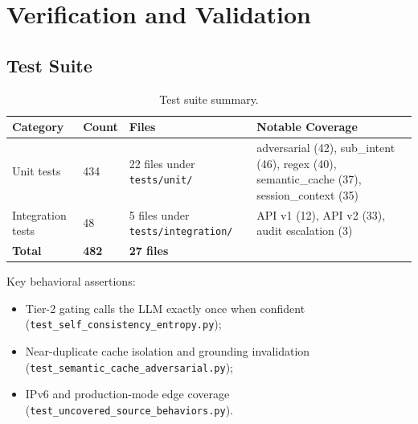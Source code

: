 ﻿\documentclass[10pt,journal,onecolumn]{IEEEtran}
\begin{document}
\section{Verification and Validation}

\subsection{Test Suite}
\begin{table}[t]
\caption{Test suite summary.}
\label{tab:testsuite}
\begin{tabularx}{\textwidth}{l l p{3cm} X}
\toprule
\textbf{Category} & \textbf{Count} & \textbf{Files} & \textbf{Notable Coverage}\\
\midrule
Unit tests & 434 & 22 files under \texttt{tests/unit/} & adversarial (42), sub\_intent (46), regex (40), semantic\_cache (37), session\_context (35)\\
Integration tests & 48 & 5 files under \texttt{tests/integration/} & API v1 (12), API v2 (33), audit escalation (3)\\
\textbf{Total} & \textbf{482} & \textbf{27 files} & \\
\bottomrule
\end{tabularx}
\end{table}

Key behavioral assertions:
\begin{itemize}
\item Tier-2 gating calls the LLM exactly once when confident (\texttt{test\_self\_consistency\_entropy.py});
\item Near-duplicate cache isolation and grounding invalidation (\texttt{test\_semantic\_cache\_adversarial.py});
\item IPv6 and production-mode edge coverage (\texttt{test\_uncovered\_source\_behaviors.py}).
\end{itemize}
\end{document}
